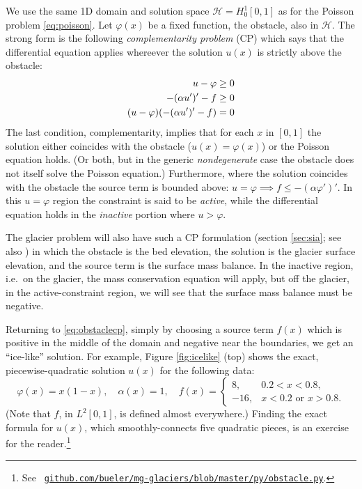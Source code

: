 \documentclass[letterpaper,final,12pt,reqno]{amsart}
\theoremstyle{claim}
\numberwithin{equation}{section}
\numberwithin{figure}{section}
\numberwithin{table}{section}
\numberwithin{theorem}{section}
\begin{document}
We use the same 1D domain and solution space $\mathcal{H}=H_0^1[0,1]$ as for the Poisson problem \eqref{eq:poisson}.  Let $\varphi(x)$ be a fixed function, the obstacle, also in $\mathcal{H}$.  The strong form is the following \emph{complementarity problem} (CP) \cite{Bueler2021,KinderlehrerStampacchia1980} which says that the differential equation applies whereever the solution $u(x)$ is strictly above the obstacle:
\begin{align}
  u - \varphi &\ge 0 \label{eq:obstaclecp} \\
  -(\alpha u')'-f &\ge 0 \notag \\
  (u-\varphi)(-(\alpha u')'-f) &= 0 \notag
\end{align}
The last condition, complementarity, implies that for each $x$ in $[0,1]$ the solution either coincides with the obstacle ($u(x)=\varphi(x)$) or the Poisson equation holds.  (Or both, but in the generic \emph{nondegenerate} \cite{KinderlehrerStampacchia1980} case the obstacle does not itself solve the Poisson equation.)  Furthermore, where the solution coincides with the obstacle the source term is bounded above: $u=\varphi \implies f \le -(\alpha\varphi')'$.  In this $u=\varphi$ region the constraint is said to be \emph{active}, while the differential equation holds in the \emph{inactive} portion where $u>\varphi$.

The glacier problem will also have such a CP formulation (section \ref{sec:sia}; see also \cite{Calvoetal2002}) in which the obstacle is the bed elevation, the solution is the glacier surface elevation, and the source term is the surface mass balance.  In the inactive region, i.e.~on the glacier, the mass conservation equation will apply, but off the glacier, in the active-constraint region, we will see that the surface mass balance must be negative.

Returning to \eqref{eq:obstaclecp}, simply by choosing a source term $f(x)$ which is positive in the middle of the domain and negative near the boundaries, we get an ``ice-like'' solution.  For example, Figure \ref{fig:icelike} (top) shows the exact, piecewise-quadratic solution $u(x)$ for the following data:
\begin{equation}
\varphi(x) = x(1-x), \quad \alpha(x)=1, \quad f(x) = \begin{cases} 8, & 0.2 < x < 0.8, \\
                                                                 -16, & x<0.2 \text{ or } x>0.8. \end{cases}  \label{eq:icelikedetails}
\end{equation}
(Note that $f$, in $L^2[0,1]$, is defined almost everywhere.)  Finding the exact formula for $u(x)$, which smoothly-connects five quadratic pieces, is an exercise for the reader.\footnote{See \, \href{https://github.com/bueler/mg-glaciers/blob/master/py/obstacle.py}{\texttt{github.com/bueler/mg-glaciers/blob/master/py/obstacle.py}}.}
\end{document}
